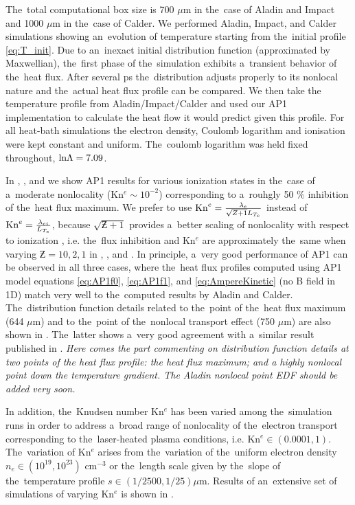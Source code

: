 The~total computational box size is 700 $\mu$m in the~case
of Aladin and Impact and 1000 $\mu$m in the~case of Calder.
We performed Aladin, Impact, and Calder simulations showing an~evolution of
temperature starting from the~initial profile \eqref{eq:T_init}. 
Due to an~inexact initial distribution function (approximated by Maxwellian),
the~first phase of the~simulation exhibits a~transient behavior of the~heat
flux. After several ps the~distribution adjusts properly to its nonlocal nature
and the~actual heat flux profile can be compared. 
We then take the temperature profile from Aladin/Impact/Calder and used 
our AP1 implementation to calculate the heat flow
it would predict given this profile. 
For all heat-bath simulations the electron density, Coulomb logarithm and 
ionisation were kept constant and uniform.
The~coulomb logarithm was held fixed throughout, $\text{ln}\Lambda = 7.09$.

In , , 
and  we show AP1 results for various ionization
states in the~case of a~moderate nonlocality (Kn$^e \sim 10^{-2}$) 
corresponding to a~rouhgly 50 $\%$ inhibition of the~heat flux maximum. 
We prefer to use 
$\text{Kn}^e = \frac{\lambda_e}{\sqrt{Z + 1}L_{T_e}}$ instead of
 $\text{Kn}^e = \frac{\lambda_{ei}}{L_{T_e}}$, because $\sqrt{\Zbar + 1}$ provides 
a~better scaling of nonlocality with respect
to ionization \cite{LMV_1983_7}, i.e. the~flux inhibition and Kn$^e$ are
approximately the~same when varying $\Zbar= 10, 2, 1$ in 
, 
, and .
In principle, a~very good performance of AP1 can be observed in all three cases,
where the~heat flux profiles computed using AP1 model equations 
\eqref{eq:AP1f0}, \eqref{eq:AP1f1}, and \eqref{eq:AmpereKinetic} 
(no B field in 1D) match very well to the~computed results 
by Aladin and Calder.
The~distribution function details related to the~point of 
the~heat flux maximum (644 $\mu$m) and to the~point of 
the~nonlocal transport effect (750 $\mu$m) are also shown 
in .
The~latter shows a~very good agreement with a~similar result published in
\cite{Sherlock_PoP2017}.
\textit{Here comes the part commenting on distribution function details at 
two points of the heat flux profile: the heat flux maximum; and a highly 
nonlocal point down the temperature gradient. 
The Aladin nonlocal point EDF should be added very soon.}

In addition, the~Knudsen number Kn$^e$ has been varied among the~simulation 
runs in order to address a~broad range of nonlocality of 
the~electron transport corresponding 
to the~laser-heated plasma conditions, i.e. Kn$^e \in (0.0001, 1)$. 
The~variation of Kn$^e$ arises from the~variation
of the~uniform electron density $n_e \in (10^{19}, 10^{23})$ cm$^{-3}$ or 
the~length scale given by the~slope of the~temperature profile 
$s \in (1/2500, 1/25) \mu$m. Results of an~extensive set of simulations of
varying Kn$^e$ is shown in .
 

